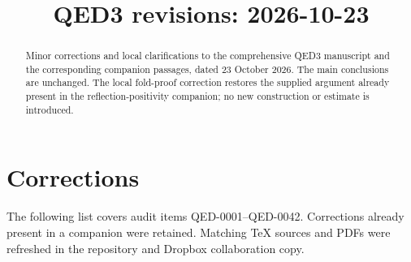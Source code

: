 \documentclass[11pt,letterpaper,reqno]{amsart}
\title[QED3 revisions: 2026-10-23]{QED3 revisions: 2026-10-23}
\date{}
\begin{document}
\begin{abstract}
Minor corrections and local clarifications to the comprehensive QED3
manuscript and the corresponding companion passages, dated 23 October 2026.
The main conclusions are unchanged. The local fold-proof correction
restores the supplied argument already present in the reflection-positivity
companion; no new construction or estimate is introduced.
\end{abstract}
\maketitle
\tableofcontents

\section{Corrections}
The following list covers audit items QED-0001--QED-0042. Corrections
already present in a companion were retained. Matching TeX sources and
PDFs were refreshed in the repository and Dropbox collaboration copy.
\end{document}
